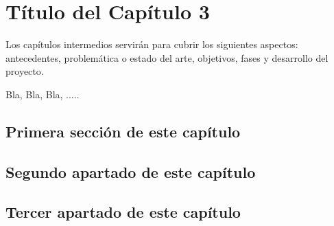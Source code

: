 \chapter{Título del Capítulo 3}
\label{ch:tres}

\noindent Los capítulos intermedios servirán para cubrir los siguientes aspectos: antecedentes, problemática o estado del arte, objetivos, fases y desarrollo del proyecto.

Bla, Bla, Bla, .....

\section{Primera sección de este capítulo}
\section{Segundo apartado de este capítulo}
\section{Tercer apartado de este capítulo}